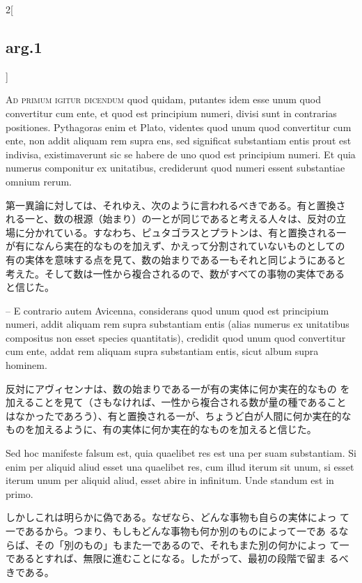 \documentclass[paper=a4paper,fontsize=10pt,jafontsize=9pt,titlepage]{jlreq}
\begin{document}
\begin{paracol}{2}[\subsection{arg.1}]
\switchcolumn*[\subsection{ad.1}]

{\scshape Ad primum igitur dicendum} quod quidam, putantes idem esse
unum quod convertitur cum ente, et quod est principium numeri, divisi
sunt in contrarias positiones. Pythagoras enim et Plato, videntes quod
unum quod convertitur cum ente, non addit aliquam rem supra ens, sed
significat substantiam entis prout est indivisa, existimaverunt sic se
habere de uno quod est principium numeri. Et quia numerus componitur ex
unitatibus, crediderunt quod numeri essent substantiae omnium rerum.

\switchcolumn

第一異論に対しては、それゆえ、次のように言われるべきである。有と置換さ
れる一と、数の根源（始まり）の一とが同じであると考える人々は、反対の立
場に分かれている。すなわち、ピュタゴラスとプラトンは、有と置換される一
が有になんら実在的なものを加えず、かえって分割されていないものとしての
有の実体を意味する点を見て、数の始まりである一もそれと同じようにあると
考えた。そして数は一性から複合されるので、数がすべての事物の実体である
と信じた。

\switchcolumn*

-- E contrario autem Avicenna, considerans quod unum quod est principium
numeri, addit aliquam rem supra substantiam entis (alias numerus ex
unitatibus compositus non esset species quantitatis), credidit quod unum
quod convertitur cum ente, addat rem aliquam supra substantiam entis,
sicut album supra hominem.

\switchcolumn

反対にアヴィセンナは、数の始まりである一が有の実体に何か実在的なもの
を加えることを見て（さもなければ、一性から複合される数が量の種であること
はなかったであろう）、有と置換される一が、ちょうど白が人間に何か実在的な
ものを加えるように、有の実体に何か実在的なものを加えると信じた。

\switchcolumn*

Sed hoc manifeste falsum est, quia quaelibet res est una per suam
substantiam. Si enim per aliquid aliud esset una quaelibet res, cum
illud iterum sit unum, si esset iterum unum per aliquid aliud, esset
abire in infinitum. Unde standum est in primo.

\switchcolumn

しかしこれは明らかに偽である。なぜなら、どんな事物も自らの実体によっ
て一であるから。つまり、もしもどんな事物も何か別のものによって一であ
るならば、その「別のもの」もまた一であるので、それもまた別の何かによっ
て一であるとすれば、無限に進むことになる。したがって、最初の段階で留ま
るべきである。


\end{paracol}
\end{document}
